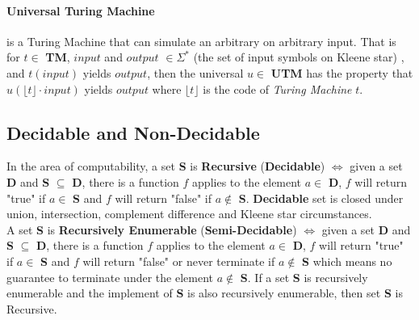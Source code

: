 \paragraph{Universal Turing Machine} is a Turing Machine that can simulate an arbitrary  on arbitrary input\cite{_universal_2016}. 
That is for $t \in$ \textbf{TM}, $input$ and $output$ $\in \Sigma^{*}$ (the set of input symbols on Kleene star\cite{jiraskova_kleene_2013}) , and $t(input)$ yields $output$, then the universal  $u\in$ \textbf{UTM} has the property that $u(\lfloor t\rfloor \cdot input)$ yields $output$ where $\lfloor t\rfloor$ is the code of \textit{Turing Machine} $t$.

\subsection{Decidable and Non-Decidable}
In the area of computability, a set \textbf{S} is \textbf{Recursive} (\textbf{Decidable}) $\iff$ given a set \textbf{D} and \textbf{S} $\subseteq$ \textbf{D}, there is a function $f$ applies to the element $a \in$ \textbf{D},
$f$ will return "true" if $a \in$ \textbf{S} and $f$ will return "false" if $a \notin$ \textbf{S}\cite{jones_computability_1997}.
\textbf{Decidable} set is closed under union, intersection, complement difference and Kleene star\cite{_recursive_2015} circumstances.\\
A set \textbf{S} is \textbf{Recursively Enumerable} (\textbf{Semi-Decidable}) $\iff$ given a set \textbf{D} and \textbf{S} $\subseteq$ \textbf{D}, there is a function $f$ applies to the element $a \in$ \textbf{D},
$f$ will return "true" if $a \in$ \textbf{S} and $f$ will return "false" or never terminate if $a \notin$ \textbf{S} which means no guarantee to terminate under the element $a \notin$ \textbf{S}\cite{jones_computability_1997}.
If a set \textbf{S} is recursively enumerable and the implement of \textbf{S} is also recursively enumerable, then set \textbf{S} is Recursive\cite{_recursively_2015}.

